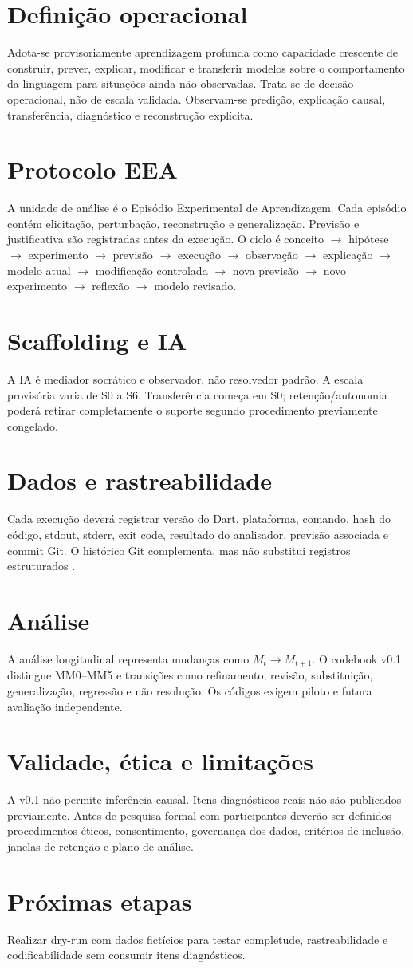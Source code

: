 \documentclass[12pt,oneside,a4paper,brazil]{abntex2}
\begin{document}
\section{Definição operacional}
Adota-se provisoriamente aprendizagem profunda como capacidade crescente de construir, prever, explicar, modificar e transferir modelos sobre o comportamento da linguagem para situações ainda não observadas. Trata-se de decisão operacional, não de escala validada. Observam-se predição, explicação causal, transferência, diagnóstico e reconstrução explícita.
\section{Protocolo EEA}
A unidade de análise é o Episódio Experimental de Aprendizagem. Cada episódio contém elicitação, perturbação, reconstrução e generalização. Previsão e justificativa são registradas antes da execução. O ciclo é conceito $\rightarrow$ hipótese $\rightarrow$ experimento $\rightarrow$ previsão $\rightarrow$ execução $\rightarrow$ observação $\rightarrow$ explicação $\rightarrow$ modelo atual $\rightarrow$ modificação controlada $\rightarrow$ nova previsão $\rightarrow$ novo experimento $\rightarrow$ reflexão $\rightarrow$ modelo revisado.
\section{Scaffolding e IA}
A IA é mediador socrático e observador, não resolvedor padrão. A escala provisória varia de S0 a S6. Transferência começa em S0; retenção/autonomia poderá retirar completamente o suporte segundo procedimento previamente congelado.
\section{Dados e rastreabilidade}
Cada execução deverá registrar versão do Dart, plataforma, comando, hash do código, stdout, stderr, exit code, resultado do analisador, previsão associada e commit Git. O histórico Git complementa, mas não substitui registros estruturados \cite{price2020}.
\section{Análise}
A análise longitudinal representa mudanças como $M_t \rightarrow M_{t+1}$. O codebook v0.1 distingue MM0--MM5 e transições como refinamento, revisão, substituição, generalização, regressão e não resolução. Os códigos exigem piloto e futura avaliação independente.
\section{Validade, ética e limitações}
A v0.1 não permite inferência causal. Itens diagnósticos reais não são publicados previamente. Antes de pesquisa formal com participantes deverão ser definidos procedimentos éticos, consentimento, governança dos dados, critérios de inclusão, janelas de retenção e plano de análise.
\section{Próximas etapas}
Realizar dry-run com dados fictícios para testar completude, rastreabilidade e codificabilidade sem consumir itens diagnósticos.

\end{document}

